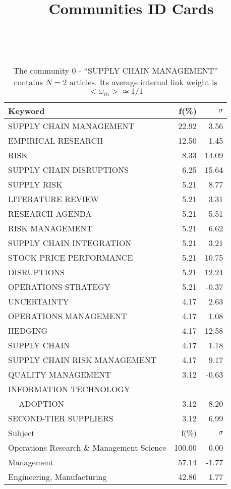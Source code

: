 \documentclass[a4paper,11pt]{report}
\title{{\bf Communities ID Cards}}
\date{\begin{flushleft}This document gather the ``ID Cards'' of the CC communities found within your database.\\
 The CC network was built by keeping a link between articles sharing at least 10 references. The communities characterized here correspond to the ones found in the level 0 (in the sense of the Louvain algo) which gathers more than 0 articles.\\
 These ID cards displays the most frequent keywords, subject categories, journals of publication, institution, countries, authors, references and reference journals of the articles of each community. The significance of an item $\sigma = \sqrt{N} (f - p) / \sqrt{p(1-p)}$ [where $N$ is the number of articles within the community and $f$ and $p$ are the proportion of articles respectively within the community and within the database displaying that item ] is also given (for example $\sigma > 5$ is really highly significant).\\
\vspace{1cm}
\copyright Sebastian Grauwin, Liu Weizhi - (2014) \end{flushleft}}
\begin{document}
\begin{landscape}
\maketitle
\clearpage

\begin{table}[!ht]
\caption{The community 0 - ``SUPPLY CHAIN MANAGEMENT'' contains $N = 2$ articles. Its average internal link weight is $<\omega_{in}> \simeq 1/1$ }
\textcolor{white}{aa}\\
{\scriptsize\begin{tabular}{|l r r|}
\hline
Keyword & f(\%) & $\sigma$\\
\hline
SUPPLY CHAIN MANAGEMENT & 22.92 & 3.56\\
EMPIRICAL RESEARCH & 12.50 & 1.45\\
RISK & 8.33 & 14.09\\
SUPPLY CHAIN DISRUPTIONS & 6.25 & 15.64\\
SUPPLY RISK & 5.21 & 8.77\\
LITERATURE REVIEW & 5.21 & 3.31\\
RESEARCH AGENDA & 5.21 & 5.51\\
RISK MANAGEMENT & 5.21 & 6.62\\
SUPPLY CHAIN INTEGRATION & 5.21 & 3.21\\
STOCK PRICE PERFORMANCE & 5.21 & 10.75\\
DISRUPTIONS & 5.21 & 12.24\\
OPERATIONS STRATEGY & 5.21 & -0.37\\
UNCERTAINTY & 4.17 & 2.63\\
OPERATIONS MANAGEMENT & 4.17 & 1.08\\
HEDGING & 4.17 & 12.58\\
SUPPLY CHAIN & 4.17 & 1.18\\
SUPPLY CHAIN RISK MANAGEMENT & 4.17 & 9.17\\
QUALITY MANAGEMENT & 3.12 & -0.63\\
INFORMATION TECHNOLOGY &  & \\
$\quad$ ADOPTION & 3.12 & 8.20\\
SECOND-TIER SUPPLIERS & 3.12 & 6.99\\
\hline
\hline
Subject & f(\%) & $\sigma$\\
\hline
Operations Research \& Management Science & 100.00 & 0.00\\
Management & 57.14 & -1.77\\
Engineering, Manufacturing & 42.86 & 1.77\\

\end{tabular}}
\end{table}
\end{landscape}
\end{document}
